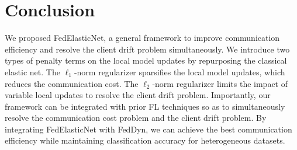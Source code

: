 \documentclass{article} %
\begin{document}


\section{Conclusion}

We proposed FedElasticNet, a general framework to improve communication efficiency and resolve the client drift problem simultaneously. We introduce two types of penalty terms on the local model updates by repurposing the classical elastic net. The $\ell_1$-norm regularizer sparsifies the local model updates, which reduces the communication cost. The $\ell_2$-norm regularizer limits the impact of variable local updates to resolve the client drift problem. Importantly, our framework can be integrated with prior FL techniques so as to simultaneously resolve the communication cost problem and the client drift problem. By integrating FedElasticNet with FedDyn, we can achieve the best communication efficiency while maintaining classification accuracy for heterogeneous datasets. 
\end{document}
